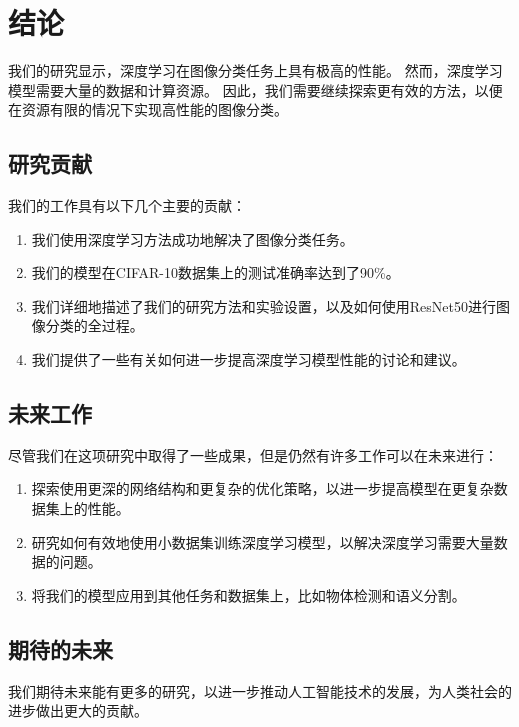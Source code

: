 

\section{结论}\label{sec:conclusion}
我们的研究显示，深度学习在图像分类任务上具有极高的性能。
然而，深度学习模型需要大量的数据和计算资源。
因此，我们需要继续探索更有效的方法，以便在资源有限的情况下实现高性能的图像分类。\par

\subsection{研究贡献}\label{subsec:research-contributions}
我们的工作具有以下几个主要的贡献：
\begin{enumerate}
    \item 我们使用深度学习方法成功地解决了图像分类任务。
    \item 我们的模型在CIFAR-10数据集上的测试准确率达到了90\%。
    \item 我们详细地描述了我们的研究方法和实验设置，以及如何使用ResNet50进行图像分类的全过程。
    \item 我们提供了一些有关如何进一步提高深度学习模型性能的讨论和建议。
\end{enumerate}

\subsection{未来工作}\label{subsec:future-work}
尽管我们在这项研究中取得了一些成果，但是仍然有许多工作可以在未来进行：
\begin{enumerate}
    \item 探索使用更深的网络结构和更复杂的优化策略，以进一步提高模型在更复杂数据集上的性能。
    \item 研究如何有效地使用小数据集训练深度学习模型，以解决深度学习需要大量数据的问题。
    \item 将我们的模型应用到其他任务和数据集上，比如物体检测和语义分割。
\end{enumerate}

\subsection{期待的未来}\label{subsec:hope-for-future}
我们期待未来能有更多的研究，以进一步推动人工智能技术的发展，为人类社会的进步做出更大的贡献。
